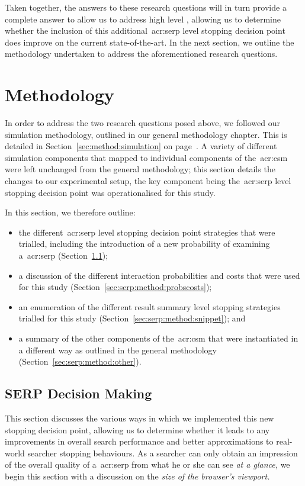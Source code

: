 Taken together, the answers to these research questions will in turn provide a complete answer to allow us to address high level , allowing us to determine whether the inclusion of this additional~\gls{acr:serp} level stopping decision point does improve on the current state-of-the-art. In the next section, we outline the methodology undertaken to address the aforementioned research questions.

\section{Methodology}
In order to address the two research questions posed above, we followed our simulation methodology, outlined in our general methodology chapter. This is detailed in Section~\ref{sec:method:simulation} on page~\pageref{sec:method:simulation}. A variety of different simulation components that mapped to individual components of the~\gls{acr:csm} were left unchanged from the general methodology; this section details the changes to our experimental setup, the key component being the~\gls{acr:serp} level stopping decision point was operationalised for this study.

In this section, we therefore outline:

\begin{itemize}
    \item{the different~\gls{acr:serp} level stopping decision point strategies that were trialled, including the introduction of a new probability of examining a~\gls{acr:serp} (Section~\ref{sec:serp:method:serp_dp});}
    \item{a discussion of the different interaction probabilities and costs that were used for this study (Section~\ref{sec:serp:method:probscosts});}
    \item{an enumeration of the different result summary level stopping strategies trialled for this study (Section~\ref{sec:serp:method:snippet}); and}
    \item{a summary of the other components of the~\gls{acr:csm} that were instantiated in a different way as outlined in the general methodology (Section~\ref{sec:serp:method:other}).}
\end{itemize}

\subsection{SERP Decision Making}\label{sec:serp:method:serp_dp}
This section discusses the various ways in which we implemented this new stopping decision point, allowing us to determine whether it leads to any improvements in overall search performance and better approximations to real-world searcher stopping behaviours. As a searcher can only obtain an impression of the overall quality of a~\gls{acr:serp} from what he or she can see \emph{at a glance,} we begin this section with a discussion on the \emph{size of the browser's viewport.}

